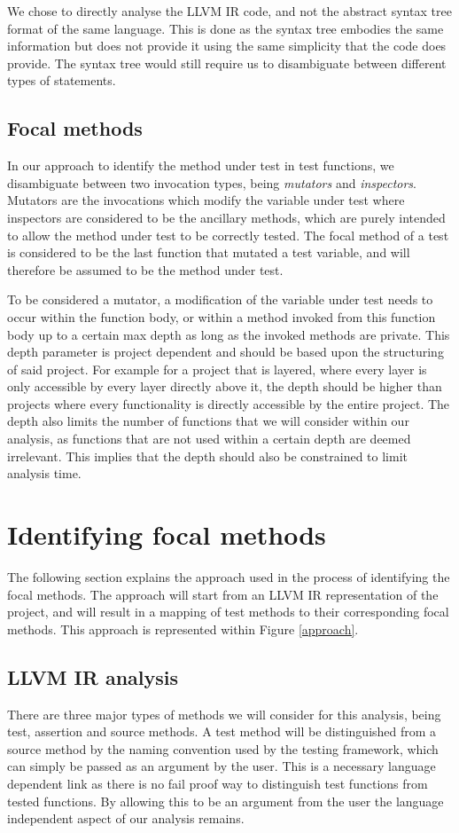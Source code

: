 \documentclass[11pt]{article}
\begin{document}
\begin{multicols}{2}
We chose to directly analyse the LLVM IR code, and not the abstract syntax tree format of the same language. This is done as the syntax tree embodies the same information but does not provide it using the same simplicity that the code does provide. The syntax tree would still require us to disambiguate between different types of statements.

\subsection{Focal methods}
In our approach to identify the method under test in test functions, we disambiguate between two invocation types, being \textit{mutators} and \textit{inspectors}. Mutators are the invocations which modify the variable under test where inspectors are considered to be the ancillary methods, which are purely intended to allow the method under test to be correctly tested. The focal method of a test is considered to be the last function that mutated a test variable, and will therefore be assumed to be the method under test.

To be considered a mutator, a modification of the variable under test needs to occur within the function body, or within a method invoked from this function body up to a certain max depth as long as the invoked methods are private. This depth parameter is project dependent and should be based upon the structuring of said project. For example for a project that is layered, where every layer is only accessible by every layer directly above it, the depth should be higher than projects where every functionality is directly accessible by the entire project. The depth also limits the number of functions that we will consider within our analysis, as functions that are not used within a certain depth are deemed irrelevant. This implies that the depth should also be constrained to limit analysis time.

\section{Identifying focal methods}
The following section explains the approach used in the process of identifying the focal methods. The approach will start from an LLVM IR representation of the project, and will result in a mapping of test methods to their corresponding focal methods. This approach is represented within Figure \ref{approach}.

\subsection{LLVM IR analysis}
There are three major types of methods we will consider for this analysis, being test, assertion and source methods. A test method will be distinguished from a source method by the naming convention used by the testing framework, which can simply be passed as an argument by the user. This is a necessary language dependent link as there is no fail proof way to distinguish test functions from tested functions. By allowing this to be an argument from the user the language independent aspect of our analysis remains.


\end{multicols}
\end{document}
